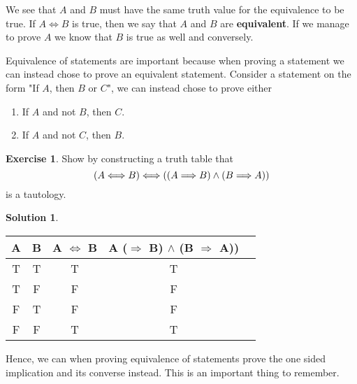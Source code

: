 \documentclass[a4paper, 11pt]{report}
\theoremstyle{plain}
\theoremstyle{definition}
\newtheorem{exrc}[thm]{Exercise}
\newtheorem*{sltn}{Solution}
\newcommand{\impl}{\Longrightarrow}
\newcommand{\eqvl}{\Longleftrightarrow}
\begin{document}
We see that $A$ and $B$ must have the same truth value for the equivalence to
be true.  If $A \eqvl B$ is true, then we say that $A$ and $B$ are
\textbf{equivalent}. If we manage to prove $A$ we know that
$B$ is true as well and conversely.

Equivalence of statements are important because when proving a statement we can instead chose to prove an equivalent statement. Consider a statement on the form "If $A$, then $B$ or $C$", we can instead chose to prove either
\begin{enumerate}
  \item If $A$ and not $B$, then $C$.
  \item If $A$ and not $C$, then $B$.
\end{enumerate}

\begin{exrc}
  Show by constructing a truth table that 
  \begin{equation}
    \notag
    (A \eqvl B) \eqvl ((A \impl B) \land (B \impl A))
  \end{equation}
  is a tautology.
\end{exrc}
\begin{sltn}
\begin{table}[h]
  \centering
  \begin{tabular}{ccccc}
    \hline
    A & B & A $\eqvl$ B & A ($\impl$ B) $\land$ (B $\impl$ A))\\
    \hline
    T& T& T& T\\
    T& F& F& F\\
    F& T& F& F\\
    F& F& T& T\\
    \hline
  \end{tabular}
\end{table}
\end{sltn}

Hence, we can when proving equivalence of statements prove the one sided
implication and its converse instead. This is an important thing to remember.
\end{document}
